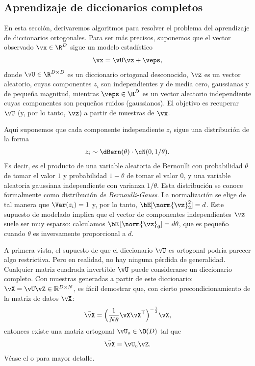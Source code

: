 \documentclass[../../book-main.tex]{subfiles}
\begin{document}
\subsection{Aprendizaje de diccionarios completos}
\label{sec:complete-dictionary}

En esta sección, derivaremos algoritmos para resolver el problema del
aprendizaje de diccionarios ortogonales. Para ser más precisos, suponemos que el
vector observado $\vx \in \R^D$ sigue un modelo estadístico
\begin{equation}
    \vx = \vU \vz + \veps,
    \label{eq:ica-model-ch2}
\end{equation}
donde $\vU \in \R^{D \times D}$ es un diccionario ortogonal desconocido,
$\vz$ es un vector aleatorio, cuyas componentes $z_i$ son independientes y de media cero, 
gaussianas y de pequeña magnitud, mientras $\veps \in \R^D$ es un vector aleatorio independiente
cuyas componentes son pequeños ruidos (gaussianos). El objetivo es recuperar
$\vU$ (y, por lo tanto, $\vz$) a partir de muestras de $\vx$.

Aquí suponemos que cada componente independiente $z_i$ sigue una distribución
de la forma $$z_i \sim \dBern(\theta) \cdot \cN(0, 1/\theta).$$ Es decir,
es el producto de una variable aleatoria de Bernoulli con probabilidad
 $\theta$ de tomar el valor $1$ y probabilidad $1-\theta$ de tomar el valor $0$, y una variable aleatoria gaussiana independiente
con varianza $1/\theta$. Esta distribución se conoce formalmente como distribución {\em de Bernoulli-Gauss}.
La normalización se elige de tal manera que $\Var(z_i) = 1$ y, por lo tanto,
$\bE[\norm{\vz}_2^2]=d$. Este supuesto de modelado implica que el vector de componentes independientes
$\vz$ suele ser muy esparso:
calculamos $\bE\left[\norm{\vz}_0\right] = d\theta$, que es pequeño
cuando $\theta$ es inversamente proporcional a $d$.

\begin{remark}
    A primera vista, el supuesto de que el diccionario $\vU$ es
    ortogonal podría parecer algo restrictiva. Pero en realidad,
    no hay ninguna pérdida de generalidad. Cualquier matriz cuadrada 
    invertible $\vU$ puede considerarse un diccionario completo. Con muestras
    generadas a partir de este diccionario: $\vX = \vU \vZ \in
    \mathbb{R}^{D\times N}$, es fácil demostrar que, con cierto
    precondicionamiento de la matriz de datos $\vX$:
    \begin{equation}
        \bar{\vX} = \Big(\frac{1}{N\theta} \vX\vX^\top\Big)^{-\frac{1}{2}}\vX,
    \end{equation}
    entonces existe una matriz ortogonal $\vU_{o} \in \O(D)$ tal que
    \begin{equation}
        \bar{\vX} = \vU_{o}\vZ.
    \end{equation}
    Véase el  o \cite{sun2017completeI} para mayor detalle.
\end{remark}
\end{document}
